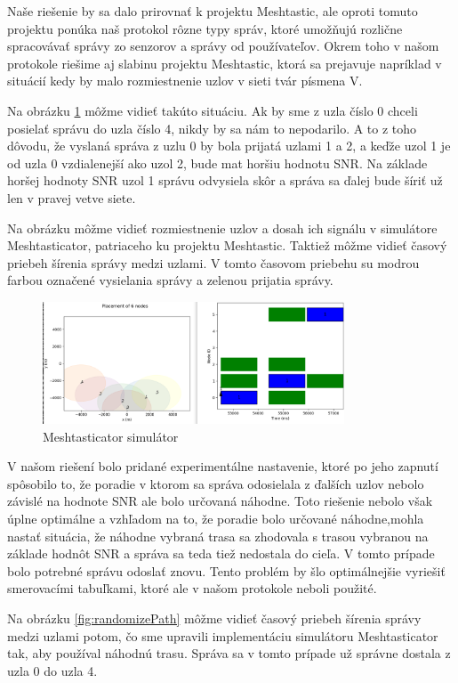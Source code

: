 \documentclass[slovak,master]{diploma}
\begin{document}
Naše riešenie by sa dalo prirovnať k projektu Meshtastic, ale oproti tomuto projektu ponúka naš protokol rôzne typy správ, ktoré umožňujú 
rozlične spracovávať správy zo senzorov a správy od používateľov. Okrem toho v našom protokole riešime aj slabinu projektu Meshtastic, ktorá 
sa prejavuje napríklad v situácií kedy by malo rozmiestnenie uzlov v sieti tvár písmena V.

Na obrázku \ref{fig:mestasticV} môžme vidieť takúto situáciu. Ak by sme z uzla číslo 0 chceli posielať správu do uzla číslo 4, nikdy by sa nám to nepodarilo.
A to z toho dôvodu, že vyslaná správa z uzlu 0 by bola prijatá uzlami 1 a 2, a keďže uzol 1 je od uzla 0 vzdialenejší ako uzol 2, bude mat horšiu hodnotu SNR.
Na základe horšej hodnoty SNR uzol 1 správu odvysiela skôr a správa sa ďalej bude šíriť už len v pravej vetve siete.

Na obrázku môžme vidieť rozmiestnenie uzlov a dosah ich signálu v simulátore Meshtasticator, patriaceho ku projektu Meshtastic. Taktiež môžme vidieť časový priebeh šírenia správy medzi uzlami. 
V tomto časovom priebehu su modrou farbou označené vysielania správy a zelenou prijatia správy.
\newpage
\begin{figure}[h!]
  \centering
  \includegraphics[width=0.8\textwidth]{Figures/meshtasticV.png}
  \caption{Meshtasticator simulátor}
  \label{fig:mestasticV}
\end{figure}

V našom riešení bolo pridané experimentálne nastavenie, ktoré po jeho zapnutí spôsobilo to, že poradie v ktorom sa správa odosielala z ďalších uzlov 
nebolo závislé na hodnote SNR ale bolo určovaná náhodne. Toto riešenie nebolo však úplne optimálne a vzhľadom na to, že poradie bolo určované 
náhodne,mohla nastať situácia, že náhodne vybraná trasa sa zhodovala s trasou vybranou 
na základe hodnôt SNR a správa sa teda tiež nedostala do cieľa. V tomto prípade bolo potrebné správu odoslať znovu. 
Tento problém by šlo optimálnejšie vyriešiť smerovacími tabuľkami, ktoré ale v našom protokole neboli použité.

Na obrázku \ref{fig:randomizePath} môžme vidieť časový priebeh šírenia správy medzi uzlami potom, čo sme upravili implementáciu simulátoru Meshtasticator tak, 
aby používal náhodnú trasu. Správa sa v tomto prípade už správne dostala z uzla 0 do uzla 4.
\end{document}
